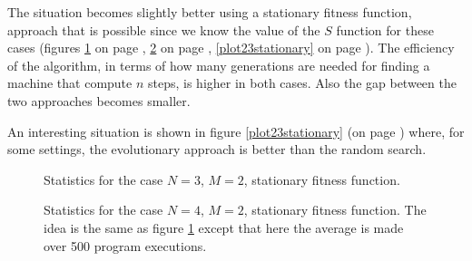 \documentclass{report}
\begin{document}
The situation becomes slightly better using a stationary fitness function, approach that is possible since we know the value of the $S$ function for these cases (figures \ref{plot32stationary} on page \pageref{plot32stationary}, \ref{plot42stationary} on page \pageref{plot42stationary}, \ref{plot23stationary} on page \pageref{plot23stationary}). The efficiency of the algorithm, in terms of how many generations are needed for finding a machine that compute $n$ steps, is higher in both cases. Also the gap between the two approaches becomes smaller.

An interesting situation is shown in figure \ref{plot23stationary} (on page \pageref{plot23stationary}) where, for some settings, the evolutionary approach is better than the random search.

\begin{figure}[h]
\centering
{}
\caption[]{Statistics for the case $N=3$, $M=2$, stationary fitness function.}
\label{plot32stationary}
\end{figure}


\begin{figure}[h]
\centering
{}
\caption[]{Statistics for the case $N=4$, $M=2$, stationary fitness function. The idea is the same as figure \ref{plot32stationary} except that here the average is made over 500 program executions.}
\label{plot42stationary}
\end{figure}
\end{document}
